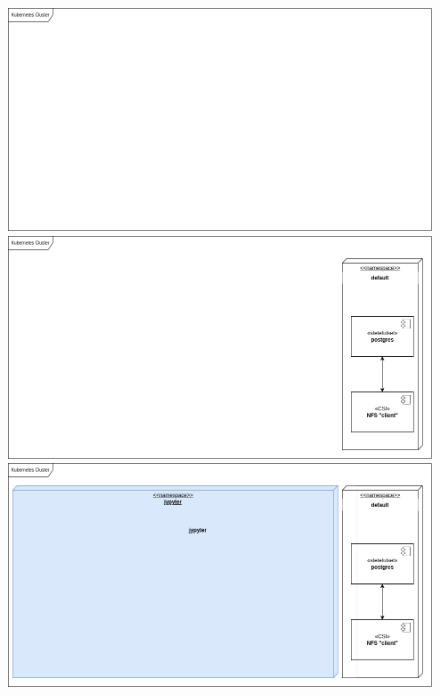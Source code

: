 \documentclass[10pt,brazil]{beamer}
\theoremstyle{definition}
\begin{document}
\begin{frame}[plain]
  \hspace*{-10mm}
  \begin{figure}
  \begin{center}
    \begin{overprint}
      \includegraphics[width=1\textwidth]{deploy-jupy-1.png}
      \includegraphics[width=1\textwidth]{deploy-jupy-2.png}
      \includegraphics[width=1\textwidth]{deploy-jupy-3.png}

\end{overprint}
\end{center}
\end{figure}
\end{frame}
\end{document}
